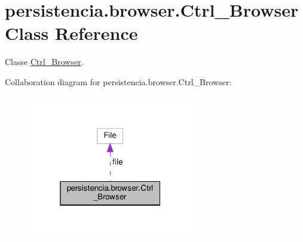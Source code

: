 \hypertarget{classpersistencia_1_1browser_1_1Ctrl__Browser}{}\section{persistencia.\+browser.\+Ctrl\+\_\+\+Browser Class Reference}
\label{classpersistencia_1_1browser_1_1Ctrl__Browser}


Classe \hyperlink{classpersistencia_1_1browser_1_1Ctrl__Browser}{Ctrl\+\_\+\+Browser}.  




Collaboration diagram for persistencia.\+browser.\+Ctrl\+\_\+\+Browser\+:
\nopagebreak
\begin{figure}[H]
\begin{center}
\leavevmode
\includegraphics[width=205pt]{classpersistencia_1_1browser_1_1Ctrl__Browser__coll__graph}
\end{center}
\end{figure}
